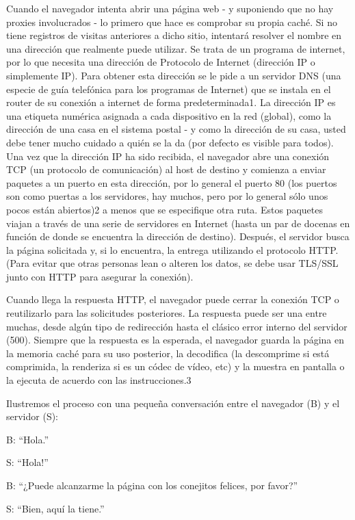 \documentclass[10pt,a5paper,twoside,,]{book}
\begin{document}
Cuando el navegador intenta abrir una página web - y suponiendo que no
hay proxies involucrados - lo primero que hace es comprobar su propia
caché. Si no tiene registros de visitas anteriores a dicho sitio,
intentará resolver el nombre en una dirección que realmente puede
utilizar. Se trata de un programa de internet, por lo que necesita una
dirección de Protocolo de Internet (dirección IP o simplemente IP). Para
obtener esta dirección se le pide a un servidor DNS (una especie de guía
telefónica para los programas de Internet) que se instala en el router
de su conexión a internet de forma predeterminada1. La dirección IP es
una etiqueta numérica asignada a cada dispositivo en la red (global),
como la dirección de una casa en el sistema postal - y como la dirección
de su casa, usted debe tener mucho cuidado a quién se la da (por defecto
es visible para todos). Una vez que la dirección IP ha sido recibida, el
navegador abre una conexión TCP (un protocolo de comunicación) al host
de destino y comienza a enviar paquetes a un puerto en esta dirección,
por lo general el puerto 80 (los puertos son como puertas a los
servidores, hay muchos, pero por lo general sólo unos pocos están
abiertos)2 a menos que se especifique otra ruta. Estos paquetes viajan a
través de una serie de servidores en Internet (hasta un par de docenas
en función de donde se encuentra la dirección de destino). Después, el
servidor busca la página solicitada y, si lo encuentra, la entrega
utilizando el protocolo HTTP. (Para evitar que otras personas lean o
alteren los datos, se debe usar TLS/SSL junto con HTTP para asegurar la
conexión).

Cuando llega la respuesta HTTP, el navegador puede cerrar la conexión
TCP o reutilizarlo para las solicitudes posteriores. La respuesta puede
ser una entre muchas, desde algún tipo de redirección hasta el clásico
error interno del servidor (500). Siempre que la respuesta es la
esperada, el navegador guarda la página en la memoria caché para su uso
posterior, la decodifica (la descomprime si está comprimida, la
renderiza si es un códec de vídeo, etc) y la muestra en pantalla o la
ejecuta de acuerdo con las instrucciones.3

Ilustremos el proceso con una pequeña conversación entre el navegador
(B) y el servidor (S):

B: ``Hola.''

S: ``Hola!''

B: ``¿Puede alcanzarme la página con los conejitos felices, por favor?''

S: ``Bien, aquí la tiene.''
\end{document}
